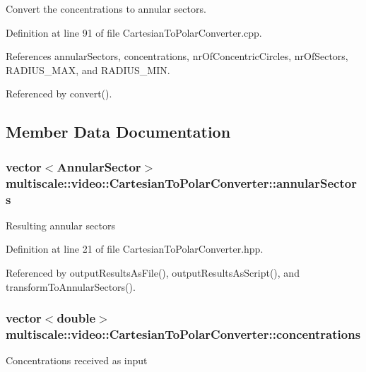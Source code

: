 Convert the concentrations to annular sectors. 



Definition at line 91 of file Cartesian\-To\-Polar\-Converter.\-cpp.



References annular\-Sectors, concentrations, nr\-Of\-Concentric\-Circles, nr\-Of\-Sectors, R\-A\-D\-I\-U\-S\-\_\-\-M\-A\-X, and R\-A\-D\-I\-U\-S\-\_\-\-M\-I\-N.



Referenced by convert().



\subsection{Member Data Documentation}
\hypertarget{classmultiscale_1_1video_1_1CartesianToPolarConverter_a3f8004ac5f8bae93c7a5e09bc37ba0ac}{
\subsubsection[{annular\-Sectors}]{\setlength{\rightskip}{0pt plus 5cm}vector$<${\bf Annular\-Sector}$>$ multiscale\-::video\-::\-Cartesian\-To\-Polar\-Converter\-::annular\-Sectors\hspace{0.3cm}{\ttfamily [private]}}}\label{classmultiscale_1_1video_1_1CartesianToPolarConverter_a3f8004ac5f8bae93c7a5e09bc37ba0ac}
Resulting annular sectors 

Definition at line 21 of file Cartesian\-To\-Polar\-Converter.\-hpp.



Referenced by output\-Results\-As\-File(), output\-Results\-As\-Script(), and transform\-To\-Annular\-Sectors().

\hypertarget{classmultiscale_1_1video_1_1CartesianToPolarConverter_a7356e201623f518132d75b7bc48407d3}{
\subsubsection[{concentrations}]{\setlength{\rightskip}{0pt plus 5cm}vector$<$double$>$ multiscale\-::video\-::\-Cartesian\-To\-Polar\-Converter\-::concentrations\hspace{0.3cm}{\ttfamily [private]}}}\label{classmultiscale_1_1video_1_1CartesianToPolarConverter_a7356e201623f518132d75b7bc48407d3}
Concentrations received as input 

